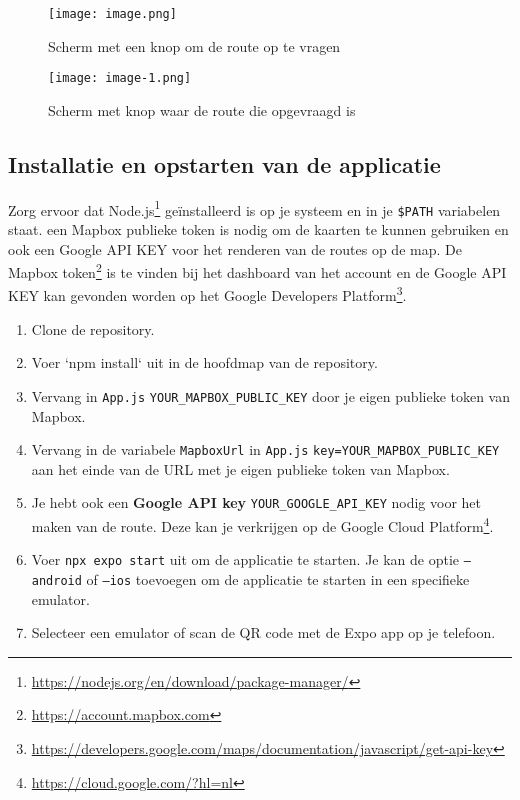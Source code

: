 \begin{figure}[htbp]
    \centering
    \begin{minipage}[b]{0.45\textwidth}
        \centering
        \texttt{[image: image.png]}
        \caption{Scherm met een knop om de route op te vragen}
        \label{fig:Scherm met een knop om de route op te vragen}
    \end{minipage}
    \hspace{0.05\textwidth}
    \begin{minipage}[b]{0.45\textwidth}
        \centering
        \texttt{[image: image-1.png]}
        \caption{Scherm met knop waar de route die opgevraagd is}
        \label{fig:Scherm met knop waar route die opgevraagd is}
    \end{minipage}
\end{figure}

\subsection{Installatie en opstarten van de applicatie}
\label{sec:installatie en opstarten van de applicatie}

Zorg ervoor dat Node.js\footnote{\url{https://nodejs.org/en/download/package-manager/}} geïnstalleerd is op je systeem en in je \texttt{\$PATH} variabelen staat.
een Mapbox publieke token is nodig om de kaarten te kunnen gebruiken en ook een Google API KEY  voor het renderen van de routes op de map. De Mapbox token\footnote{\url{https://account.mapbox.com}} is te vinden bij het dashboard van het account en de Google API KEY kan gevonden worden op het Google Developers Platform\footnote{\url{https://developers.google.com/maps/documentation/javascript/get-api-key}}.

\begin{enumerate}
    \item Clone de repository.
    \item Voer `npm install` uit in de hoofdmap van de repository.
    \item Vervang in \texttt{App.js} \texttt{YOUR\_MAPBOX\_PUBLIC\_KEY} door je eigen publieke token van Mapbox.
    \item Vervang in de variabele \texttt{MapboxUrl} in \texttt{App.js} \texttt{key=YOUR\_MAPBOX\_PUBLIC\_KEY} aan het einde van de URL met je eigen publieke token van Mapbox.
    \item Je hebt ook een \textbf{Google API key} \texttt{YOUR\_GOOGLE\_API\_KEY} nodig voor het maken van de route. Deze kan je verkrijgen op de Google Cloud Platform\footnote{\url{https://cloud.google.com/?hl=nl}}.
    \item Voer \texttt{npx expo start} uit om de applicatie te starten. Je kan de optie \texttt{--android} of \texttt{--ios} toevoegen om de applicatie te starten in een specifieke emulator.
    \item Selecteer een emulator of scan de QR code met de Expo app op je telefoon.
\end{enumerate}


